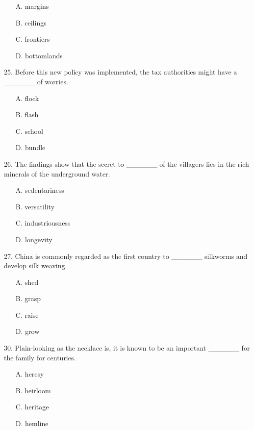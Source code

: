 \documentclass[UTF8,11pt]{ctexart}
\begin{document}
\begin{itemize}[leftmargin=2em,itemsep=.2em,topsep=.4em]\item[A.] margins
\item[B.] ceilings
\item[C.] frontiers
\item[D.] bottomlands
\end{itemize}

25. Before this new policy was implemented, the tax authorities might have a \_\_\_\_\_\_ of worries.


\begin{itemize}[leftmargin=2em,itemsep=.2em,topsep=.4em]\item[A.] flock
\item[B.] flash
\item[C.] school
\item[D.] bundle
\end{itemize}

26. The findings show that the secret to \_\_\_\_\_\_ of the villagers lies in the rich minerals of the underground water.


\begin{itemize}[leftmargin=2em,itemsep=.2em,topsep=.4em]\item[A.] sedentariness
\item[B.] versatility
\item[C.] industriousness
\item[D.] longevity
\end{itemize}

27. China is commonly regarded as the first country to \_\_\_\_\_\_ silkworms and develop silk weaving.


\begin{itemize}[leftmargin=2em,itemsep=.2em,topsep=.4em]\item[A.] shed
\item[B.] grasp
\item[C.] raise
\item[D.] grow
\end{itemize}

30. Plain-looking as the necklace is, it is known to be an important \_\_\_\_\_\_ for the family for centuries.


\begin{itemize}[leftmargin=2em,itemsep=.2em,topsep=.4em]\item[A.] heresy
\item[B.] heirloom
\item[C.] heritage
\item[D.] hemline
\end{itemize}
\end{document}
